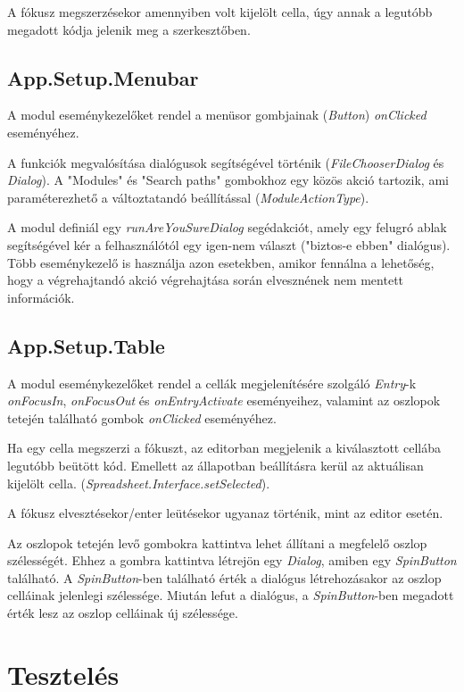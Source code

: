 A fókusz megszerzésekor amennyiben volt kijelölt cella, úgy annak a legutóbb megadott kódja jelenik meg a szerkesztőben.

\subsection{App.Setup.Menubar}

A modul eseménykezelőket rendel a menüsor gombjainak (\textit{Button}) \textit{onClicked} eseményéhez.

A funkciók megvalósítása dialógusok segítségével történik (\textit{FileChooserDialog} és \textit{Dialog}). A "Modules" és "Search paths" gombokhoz egy közös akció tartozik, ami paraméterezhető a változtatandó beállítással (\textit{ModuleActionType}). 

A modul definiál egy \textit{runAreYouSureDialog} segédakciót, amely egy felugró ablak segítségével kér a felhasználótól egy igen-nem választ ("biztos-e ebben" dialógus). Több eseménykezelő is használja azon esetekben, amikor fennálna a lehetőség, hogy a végrehajtandó akció végrehajtása során elvesznének nem mentett információk.

\subsection{App.Setup.Table}

A modul eseménykezelőket rendel a cellák megjelenítésére szolgáló \textit{Entry}-k \textit{onFocusIn}, \textit{onFocusOut} és \textit{onEntryActivate} eseményeihez, valamint az oszlopok tetején található gombok \textit{onClicked} eseményéhez.

Ha egy cella megszerzi a fókuszt, az editorban megjelenik a kiválasztott cellába legutóbb beütött kód. Emellett az állapotban beállításra kerül az aktuálisan kijelölt cella. (\textit{Spreadsheet.Interface.setSelected}).

A fókusz elvesztésekor/enter leütésekor ugyanaz történik, mint az editor esetén.

Az oszlopok tetején levő gombokra kattintva lehet állítani a megfelelő oszlop szélességét. Ehhez a gombra kattintva létrejön egy \textit{Dialog}, amiben egy \textit{SpinButton} található. A \textit{SpinButton}-ben található érték a dialógus létrehozásakor az oszlop celláinak jelenlegi szélessége. Miután lefut a dialógus, a \textit{SpinButton}-ben megadott érték lesz az oszlop celláinak új szélessége.

\section{Tesztelés}

